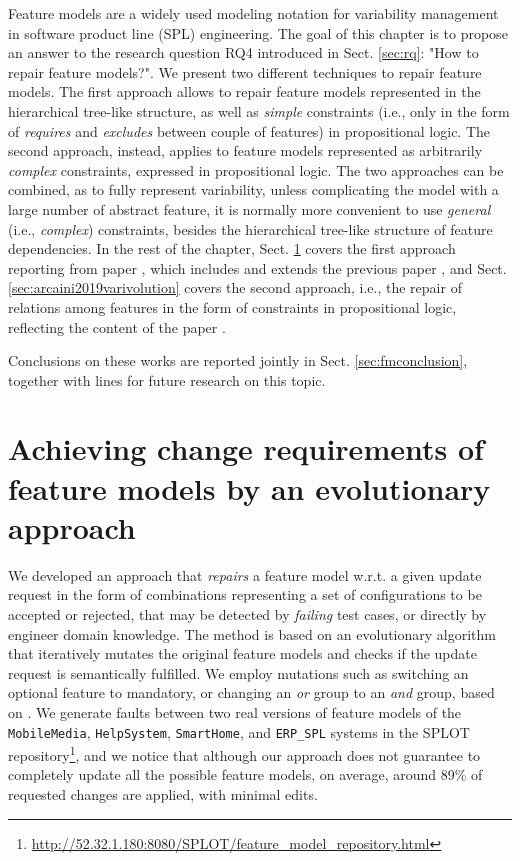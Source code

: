 \begin{tikzborder}{\cite{Gargantini16:validation}}
\begin{tikzborder}{\cite{gargantini_combinatorial_2017}}
\begin{tikzborder}{\cite{garn2019}}
Feature models are a widely used modeling notation for variability management in software product line (SPL) engineering. 
The goal of this chapter is to propose an answer to the research question RQ4 introduced in Sect. \ref{sec:rq}: "How to repair feature models?".
We present two different techniques to repair feature models.
The first approach allows to repair feature models represented in the hierarchical tree-like structure, as well as \textit{simple} constraints (i.e., only in the form of \textit{requires} and \textit{excludes} between couple of features) in propositional logic.
The second approach, instead, applies to feature models represented as arbitrarily \textit{complex} constraints, expressed in propositional logic.
The two approaches can be combined, as to fully represent variability, unless complicating the model with a large number of abstract feature, it is normally more convenient to use \textit{general} (i.e., \textit{complex}) constraints, besides the hierarchical tree-like structure of feature dependencies.
In the rest of the chapter, Sect. \ref{sec:arcaini2019achieving} covers the first approach reporting from paper \cite{arcaini2019achieving}, which includes and extends the previous paper \cite{arcaini_evolutionary_2018}, and Sect. \ref{sec:arcaini2019varivolution} covers the second approach, i.e., the repair of relations among features in the form of constraints in propositional logic, reflecting the content of the paper \cite{arcaini2019varivolution}.

Conclusions on these works are reported jointly in Sect. \ref{sec:fmconclusion}, together with lines for future research on this topic.


\section{Achieving change requirements of feature models by an evolutionary approach}\label{sec:arcaini2019achieving}
We developed an approach that \textit{repairs} a feature model w.r.t. a given update request in the form of combinations representing a set of configurations to be accepted or rejected, that may be detected by \textit{failing} test cases, or directly by engineer domain knowledge. %
The method is based on an evolutionary algorithm that iteratively mutates the original feature models and checks if the update request is semantically fulfilled.
We employ mutations such as switching an optional feature to mandatory, or changing an \emph{or} group to an \emph{and} group, based on \cite{arcaini_evolutionary_2018}.
We generate faults between two real versions of feature models of the {\tt MobileMedia}, {\tt HelpSystem},  {\tt SmartHome}, and {\tt ERP\_SPL} systems in the SPLOT repository\footnote{\url{http://52.32.1.180:8080/SPLOT/feature_model_repository.html}}, and we notice that although our approach does not guarantee to completely update all the possible feature models, on average, around 89\% of requested changes are applied, with minimal edits.%


\end{tikzborder}
\end{tikzborder}
\end{tikzborder}
